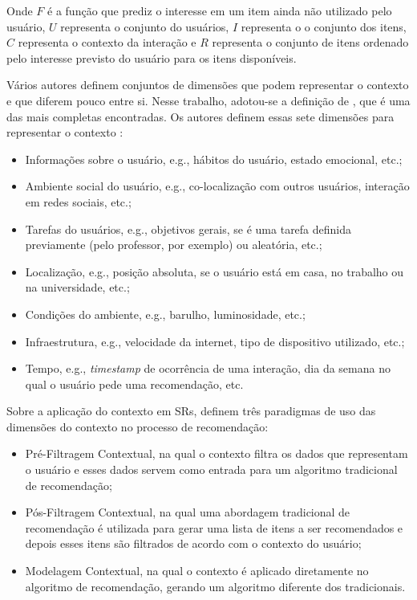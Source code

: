 Onde $F$ é a função que prediz o interesse em um item ainda não utilizado pelo usuário, $U$ representa o conjunto do
usuários, $I$ representa o o conjunto dos itens, $C$ representa o contexto da interação e $R$ representa o conjunto de itens
ordenado pelo interesse previsto do usuário para os itens disponíveis.

Vários autores definem conjuntos de dimensões que podem representar o contexto
\cite{schilit1994context, chen2000survey, zimmermann2007operational} e que diferem pouco entre si. Nesse trabalho,
adotou-se a definição de , que é uma das mais completas encontradas. Os autores definem essas
sete dimensões para representar o contexto \cite{schmidt1999there}:

\begin{itemize}
\item Informações sobre o usuário, e.g., hábitos do usuário, estado emocional, etc.;
\item Ambiente social do usuário, e.g., co-localização com outros usuários, interação em redes sociais, etc.;
\item Tarefas do usuários, e.g., objetivos gerais, se é uma tarefa definida previamente (pelo professor, por exemplo)
ou aleatória, etc.;
\item Localização, e.g., posição absoluta, se o usuário está em casa, no trabalho ou na universidade, etc.;
\item Condições do ambiente, e.g., barulho, luminosidade, etc.;
\item Infraestrutura, e.g., velocidade da internet, tipo de dispositivo utilizado, etc.;
\item Tempo, e.g., \textit{timestamp} de ocorrência de uma interação, dia da semana no qual o usuário pede uma recomendação, etc.
\end{itemize}

Sobre a aplicação do contexto em SRs,  definem três paradigmas de uso das dimensões
do contexto no processo de recomendação:

\begin{itemize}
\item Pré-Filtragem Contextual, na qual o contexto filtra os dados que representam o usuário e esses dados servem
como entrada para um algoritmo tradicional de recomendação;
\item Pós-Filtragem Contextual, na qual uma abordagem tradicional de recomendação é utilizada para gerar uma lista de
itens a ser recomendados e depois esses itens são filtrados de acordo com o contexto do usuário;
\item Modelagem Contextual, na qual o contexto é aplicado diretamente no algoritmo de recomendação, gerando um
algoritmo diferente dos tradicionais.
\end{itemize}

